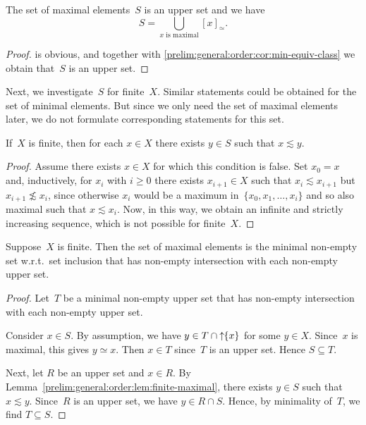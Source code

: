 \begin{proposition} \label{prelim:order:maximal-elements-upper-set}
	The set of maximal elements~$S$ is an upper set and we have
	\begin{equation}\label{prelim:general:order:set-of-maximal-elements}
		S = \bigcup_{\text{$x$ is maximal}} [x]_{\simeq}.
	\end{equation}
\end{proposition}
\begin{proof}
	 is obvious,
	and together with \cref{prelim:general:order:cor:min-equiv-class}
	we obtain that~$S$ is an upper set.	
\end{proof}

Next, we investigate~$S$ for finite~$X$. Similar statements could be obtained
for the set of minimal elements. But since we only need the set of maximal elements
later, we do not formulate corresponding statements for this set.

\begin{lemma} \label{prelim:general:order:lem:finite-maximal}
	If~$X$ is finite, then
	for each $x \in X$ there exists $y \in S$ such that $x \lesssim y$.
\end{lemma}
\begin{proof}
	Assume there exists $x \in X$ for which this condition is false.
	Set $x_0 = x$ and, inductively, for $x_{i}$ with $i \ge 0$
	there exists $x_{i+1} \in X$ such that $x_i \lesssim x_{i+1}$
	but $x_{i+1} \not\lesssim x_i$,
	since otherwise $x_i$ would be a maximum
	in~$\{x_0, x_1, \ldots, x_i\}$
	and so also maximal such that $x \lesssim x_i$.
	Now, in this way, we obtain an infinite and strictly increasing sequence,
	which is not possible for finite~$X$.
\end{proof}

\begin{proposition} \label{prelim:prop:maximal-elements-and-upper-sets}
	Suppose~$X$ is finite.
	Then the set of maximal elements is the minimal non-empty
	set w.r.t.~set inclusion that has non-empty
	intersection with each non-empty upper set.	
\end{proposition}
\begin{proof}
	Let~$T$ be a minimal non-empty upper set
	that has non-empty intersection with each non-empty upper set.
	
	Consider $x \in S$.
	By assumption, we have $y \in T \cap \mbox{\ensuremath{\displaystyle \uparrow \!\!\{x\}}}$ for some $y \in X$.
	Since~$x$ is maximal, this gives $y \simeq x$.
	Then $x \in T$ since~$T$ is an upper set.	
	Hence $S \subseteq T$.
	
	Next, let $R$ be an upper set and $x \in R$. 
	By Lemma~\ref{prelim:general:order:lem:finite-maximal}, 
	there exists $y \in S$ such that $x \lesssim y$.
	Since~$R$ is an upper set, we have $y \in R \cap S$.
	Hence, by minimality of~$T$, we find $T \subseteq S$.
\end{proof}

